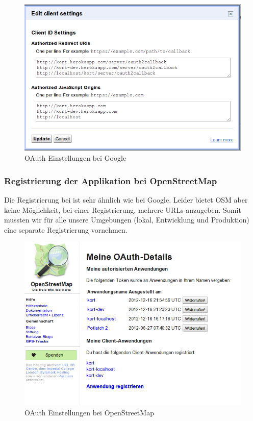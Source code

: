 \begin{figure}[H]
	\centering
	\includegraphics[scale=0.5]{images/implementation/backend/oauth-google-settings}
	\caption{OAuth Einstellungen bei Google}
\end{figure}

\subsubsection{Registrierung der Applikation bei OpenStreetMap}
Die Registrierung bei  ist sehr ähnlich wie bei Google.
Leider bietet OSM aber keine Möglichkeit, bei einer Registrierung, mehrere URLs anzugeben.
Somit mussten wir für alle unsere Umgebungen (lokal, Entwicklung und Produktion) eine separate Registrierung vornehmen.

\begin{figure}[H]
	\centering
	\includegraphics[scale=0.5]{images/implementation/backend/oauth-osm}
	\caption{OAuth Einstellungen bei OpenStreetMap}
\end{figure}

